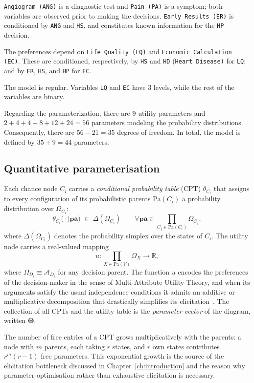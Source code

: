 \texttt{Angiogram (ANG)} is a diagnostic test and \texttt{Pain (PA)} is a symptom; both variables are observed prior to making the decisions. \texttt{Early Results (ER)} is conditioned by \texttt{ANG} and \texttt{HS}, and constitutes known information for the \texttt{HP} decision. 

The preferences depend on \texttt{Life Quality (LQ)} and \texttt{Economic Calculation (EC)}. These are conditioned, respectively, by \texttt{HS} and \texttt{HD} (\texttt{Heart Disease)} for \texttt{LQ}; and by \texttt{ER}, \texttt{HS}, and \texttt{HP} for \texttt{EC}.

The model is regular. Variables \texttt{LQ} and \texttt{EC} have 3 levels, while the rest of the variables are binary. 

Regarding the parameterization, there are 9 utility parameters and $2 + 4 + 4 + 8 + 12 + 24 = 56$ parameters modeling the probability distributions. Consequently, there are $56 - 21 = 35$ degrees of freedom. In total, the model is defined by $35 + 9 = 44$ parameters.

\subsection{Quantitative parameterisation}

Each chance node $C_i$ carries a \emph{conditional probability
table} (CPT) $\theta_{C_i}$ that assigns to every configuration of
its probabilistic parents $\mathrm{Pa}(C_i)$ a probability distribution over
$\Omega_{C_i}$:
\[
   \theta_{C_i}\bigl(\cdot \mid \mathbf{pa}\bigr) \;\in\;
   \Delta(\Omega_{C_i})
   \qquad
   \forall \mathbf{pa}\in\prod_{C_j\in\mathrm{Pa}(C_i)}\Omega_{C_j},
\]
where $\Delta(\Omega_{C_i})$ denotes the probability simplex over the
states of $C_i$. The utility node carries a real-valued mapping
\[
   u : \prod_{X\in\mathrm{Pa}(V)}\Omega_X \longrightarrow \mathbb{R},
\]
where $\Omega_{D_i}\equiv\mathcal{A}_{D_i}$ for any decision parent.
The function $u$ encodes the preferences of the decision-maker in
the sense of Multi-Attribute Utility Theory, and when its arguments
satisfy the usual independence conditions it admits an additive or
multiplicative decomposition that drastically simplifies its
elicitation~\cite{riosinsua2002maut}. The collection of all CPTs
and the utility table is the \emph{parameter vector} of the
diagram, written $\boldsymbol{\Theta}$.

\begin{remark}
\label{rem:explosion}
The number of free entries of a CPT grows multiplicatively with the
parents: a node with $m$ parents, each taking $r$ states, and $r$
own states contributes $r^{m}(r-1)$ free parameters. This
exponential growth is the source of the elicitation bottleneck
discussed in Chapter~\ref{ch:introduction} and the reason why
parameter optimisation rather than exhaustive elicitation is
necessary.
\end{remark}


